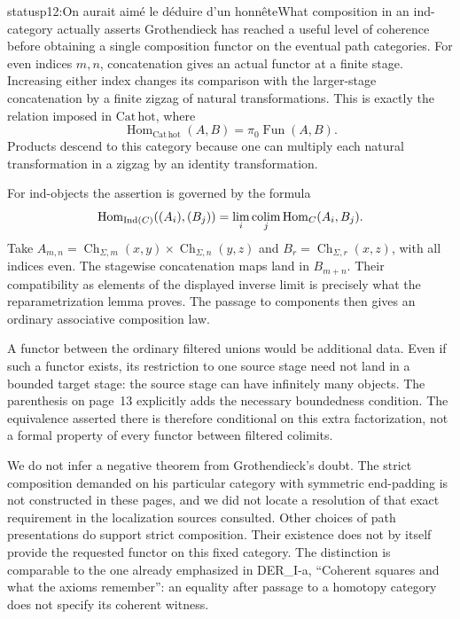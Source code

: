 \begin{dcomment}{status}{p12:On aurait aimé le déduire d'un honnête}{What composition in an ind-category actually asserts}
Grothendieck has reached a useful level of coherence before obtaining a single composition functor on the eventual path categories. For even indices $m,n$, concatenation gives an actual functor at a finite stage. Increasing either index changes its comparison with the larger-stage concatenation by a finite zigzag of natural transformations. This is exactly the relation imposed in $\mathrm{Cat\,hot}$, where
\[
 \operatorname{Hom}_{\mathrm{Cat\,hot}}(A,B)
   =\pi_0\operatorname{Fun}(A,B).
\]
Products descend to this category because one can multiply each natural transformation in a zigzag by an identity transformation.

For ind-objects the assertion is governed by the formula
\[
 \operatorname{Hom}_{\operatorname{Ind}(C)}
       ((A_i),(B_j))
   =\lim_i\mathop{\rm colim}_j\operatorname{Hom}_C(A_i,B_j).
\]
Take $A_{m,n}=\operatorname{Ch}_{\Sigma,m}(x,y)\times
\operatorname{Ch}_{\Sigma,n}(y,z)$ and $B_r=\operatorname{Ch}_{\Sigma,r}(x,z)$, with all indices even. The stagewise concatenation maps land in $B_{m+n}$. Their compatibility as elements of the displayed inverse limit is precisely what the reparametrization lemma proves. The passage to components then gives an ordinary associative composition law.

A functor between the ordinary filtered unions would be additional data. Even if such a functor exists, its restriction to one source stage need not land in a bounded target stage: the source stage can have infinitely many objects. The parenthesis on page~13 explicitly adds the necessary boundedness condition. The equivalence asserted there is therefore conditional on this extra factorization, not a formal property of every functor between filtered colimits.

We do not infer a negative theorem from Grothendieck's doubt. The strict composition demanded on his particular category with symmetric end-padding is not constructed in these pages, and we did not locate a resolution of that exact requirement in the localization sources consulted. Other choices of path presentations do support strict composition. Their existence does not by itself provide the requested functor on this fixed category. The distinction is comparable to the one already emphasized in DER\_I-a, ``Coherent squares and what the axioms remember'': an equality after passage to a homotopy category does not specify its coherent witness.
\end{dcomment}


